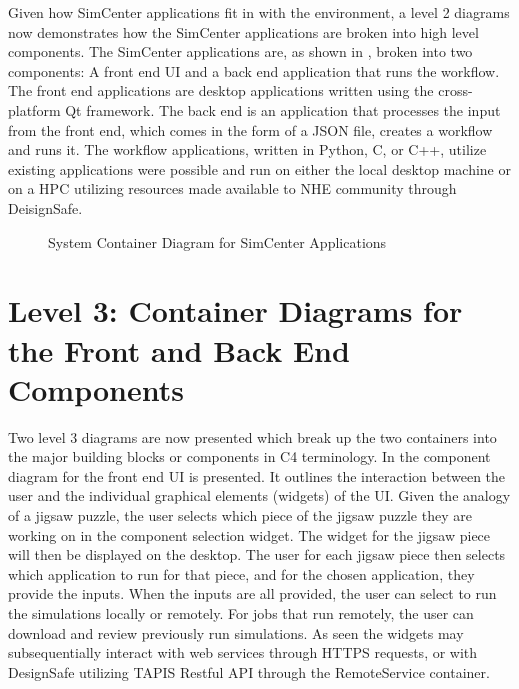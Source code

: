 Given how SimCenter applications fit in with the environment, a level 2 diagrams now demonstrates how the SimCenter applications are broken into high level components. The SimCenter applications are, as shown in , broken into two components: A front end UI and a back end application that runs the workflow. The front end applications are desktop applications written using the cross-platform Qt framework. The back end is an application that processes the input from the front end, which comes in the form of a JSON file, creates a workflow and runs it. The workflow applications, written in Python, C, or C++, utilize existing applications were possible and run on either the local desktop machine or on a HPC utilizing resources made available to NHE community through DeisignSafe. 


\begin{figure}[!htbp]
  \caption{System Container Diagram for SimCenter Applications}
  \label{fig:container}
\end{figure}

 

\section{Level 3: Container Diagrams for the Front and Back End Components}

Two level 3 diagrams are now presented which break up the two containers into the major building blocks or components in C4 terminology. In  the component diagram for the front end UI is presented. It outlines the interaction between the user and the individual graphical elements (widgets) of the UI. Given the analogy of a jigsaw puzzle, the user selects which piece of the jigsaw puzzle they are working on in the component selection widget. The widget for the jigsaw piece will then be displayed on the desktop. The user for each jigsaw piece then selects which application to run for that piece, and for the chosen application, they provide the inputs. When the inputs are all provided, the user can select to run the simulations locally or remotely. For jobs that run remotely, the user can download and review previously run simulations. As seen the widgets may subsequentially interact with web services through HTTPS requests, or with DesignSafe utilizing TAPIS Restful API through the RemoteService container.



